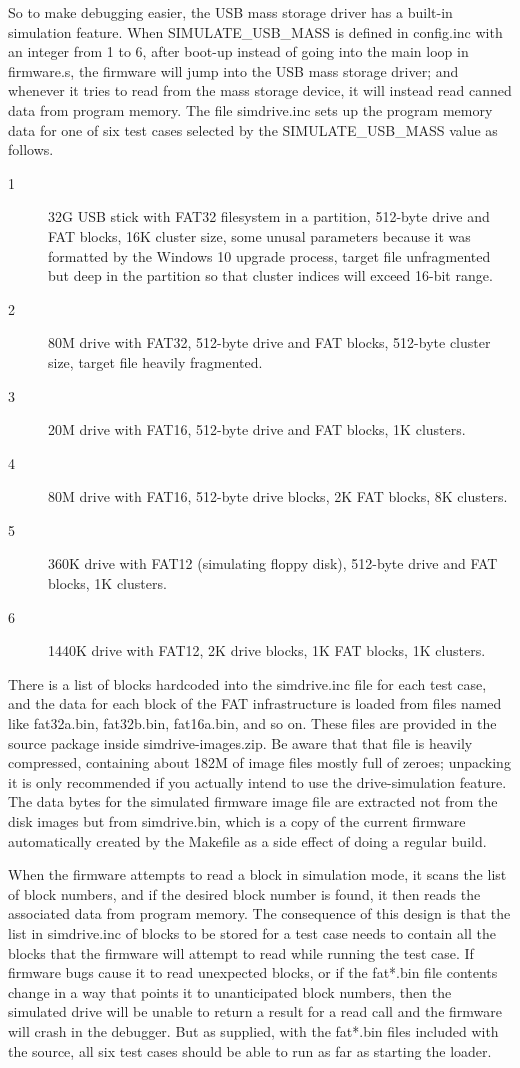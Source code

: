 So to make debugging easier, the USB mass storage driver has a built-in
simulation feature.  When SIMULATE\_USB\_MASS is defined in config.inc with
an integer from 1 to 6, after boot-up instead of going into the main loop in
firmware.s, the firmware will jump into the USB mass storage driver; and
whenever it tries to read from the mass storage device, it will instead read
canned data from program memory.  The file simdrive.inc sets up the program
memory data for one of six test cases selected by the SIMULATE\_USB\_MASS
value as follows.

\begin{description}
  \item[1] 32G USB stick with FAT32 filesystem in a partition, 512-byte
    drive and FAT blocks, 16K cluster size, some unusal parameters because
    it was formatted by the Windows 10 upgrade process, target file
    unfragmented but deep in the partition so that cluster indices will exceed
    16-bit range.
  \item[2] 80M drive with FAT32, 512-byte drive and FAT blocks, 512-byte
    cluster size, target file heavily fragmented.
  \item[3] 20M drive with FAT16, 512-byte drive and FAT blocks, 1K clusters.
  \item[4] 80M drive with FAT16, 512-byte drive blocks, 2K FAT
    blocks, 8K clusters.
  \item[5] 360K drive with FAT12 (simulating floppy disk), 512-byte drive and
    FAT blocks, 1K clusters.
  \item[6] 1440K drive with FAT12, 2K drive blocks, 1K FAT blocks, 1K
    clusters.
\end{description}

There is a list of blocks hardcoded into the simdrive.inc file for each test
case, and the data for each block of the FAT infrastructure is loaded from
files named like fat32a.bin, fat32b.bin, fat16a.bin, and so on.  These files
are provided in the source package inside simdrive-images.zip.  Be aware
that that file is heavily compressed, containing about 182M of image files
mostly full of zeroes; unpacking it is only recommended if you actually
intend to use the drive-simulation feature.
The data bytes for the simulated firmware image file are extracted not from
the disk images but from simdrive.bin, which is a copy of the current
firmware automatically created by the Makefile as a side effect of doing a
regular build.

When the firmware attempts to read a block in simulation mode, it scans the
list of block numbers, and if the desired block number is found, it then
reads the associated data from program memory.  The consequence of this
design is that the list in simdrive.inc of blocks to be stored for a test
case needs to contain all the blocks that the firmware will attempt to read
while running the test case.  If firmware bugs cause it to read unexpected
blocks, or if the fat*.bin file contents change in a way that points it to
unanticipated block numbers, then the simulated drive will be unable to
return a result for a read call and the firmware will crash in the debugger. 
But as supplied, with the fat*.bin files included with the source, all six
test cases should be able to run as far as starting the loader.

